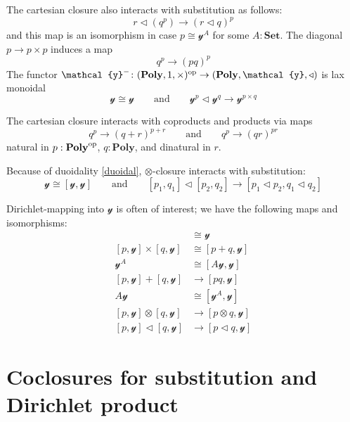 \documentclass[11pt, one side, article]{memoir}
\theoremstyle{definition}
\theoremstyle{plain}
\newcommand{\Cat}[1]{\mathbf{#1}}%
\newcommand{\op}{^\tn{op}}
\newcommand{\tn}[1]{\textnormal{#1}}
\newcommand{\smset}{\Cat{Set}}
\newcommand{\yon}{\mathcal{y}}
\newcommand{\poly}{\Cat{Poly}}
\newcommand{\0}{\textsf{0}}
\newcommand{\1}{\tn{\textsf{1}}}
\newcommand{\tri}{\mathbin{\triangleleft}}
\newcommand{\qqand}{\qquad\text{and}\qquad}
\begin{document}
The cartesian closure also interacts with substitution as follows:
\begin{equation}
	r\tri (q^p)\to (r\tri q)^p
\end{equation}
and this map is an isomorphism in case $p\cong\yon^A$ for some $A:\smset$. The diagonal $p\to p\times p$ induces a map
\begin{equation}
	q^p\to (pq)^p
\end{equation}
The functor $\yon^-\colon(\poly,1,\times)\op\to(\poly,\yon,\tri)$ is lax monoidal
\begin{equation}
	\yon\cong\yon
	\qqand
	\yon^p\tri\yon^q\to\yon^{p\times q}
\end{equation}

The cartesian closure interacts with coproducts and products via maps
\begin{equation}
  q^p\to(q+r)^{p+r}
  \qqand
	q^p\to(qr)^{pr}
\end{equation}
natural in $p:\poly\op$, $q:\poly$, and dinatural in $r$.

Because of duoidality \eqref{duoidal}, $\otimes$-closure interacts with substitution:
\begin{equation}\label{eqn.shapiro_1}
	\yon\cong[\yon,\yon]
	\qqand
	[p_1,q_1]\tri[p_2,q_2]\to [p_1\tri p_2,q_1\tri q_2]
\end{equation}


Dirichlet-mapping into $\yon$ is often of interest; we have the following maps and isomorphisms:
\begin{align}
	[\yon,\yon]&\cong\yon\\
  [p,\yon]\times[q,\yon]&\cong[p+q,\yon]\\
  \yon^A&\cong[A\yon,\yon]\\
  [p,\yon]+[q,\yon]&\to[pq,\yon]\\
  A\yon&\cong[\yon^A,\yon]\\
	[p,\yon]\otimes[q,\yon]&\to[p\otimes q,\yon]\\
	[p,\yon]\tri[q,\yon]&\to[p\tri q,\yon]
\end{align}


\chapter{Coclosures for substitution and Dirichlet product}
\end{document}
